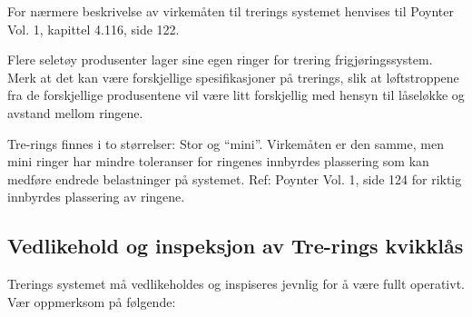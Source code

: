 For nærmere beskrivelse av virkemåten til trerings systemet henvises til Poynter Vol. 1, kapittel 4.116, side 122.

Flere seletøy produsenter lager sine egen ringer for trering frigjøringssystem. Merk at det kan være forskjellige spesifikasjoner på trerings, slik at løftstroppene fra de forskjellige produsentene vil være litt forskjellig med hensyn til låseløkke og avstand mellom ringene.

Tre-rings finnes i to størrelser: Stor og ``mini''. Virkemåten er den samme, men mini ringer har mindre toleranser for ringenes innbyrdes plassering som kan medføre endrede belastninger på systemet. Ref: Poynter Vol. 1, side 124 for riktig innbyrdes plassering av ringene.

\subsection{Vedlikehold og inspeksjon av Tre-rings kvikklås}
Trerings systemet må vedlikeholdes og inspiseres jevnlig for å være fullt operativt. Vær oppmerksom på følgende:
